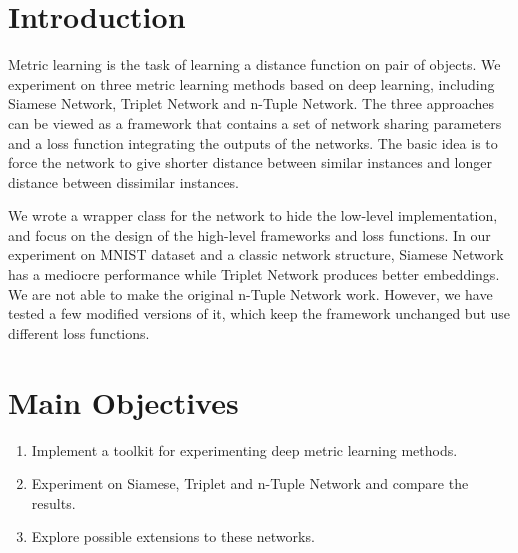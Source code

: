 \documentclass[a0,portrait]{a0poster}
\begin{document}
	\begin{multicols}{2} %
		
		
		\color{SaddleBrown} %
		
		\section*{Introduction}
		Metric learning is the task of learning a distance function on pair of objects. We experiment on three metric learning methods based on deep learning, including Siamese Network, Triplet Network and n-Tuple Network. The three approaches can be viewed as a framework that contains a set of network sharing parameters and a loss function integrating the outputs of the networks. The basic idea is to force the network to give shorter distance between similar instances and longer distance between dissimilar instances.
		
		We wrote a wrapper class for the network to hide the low-level implementation, and focus on the design of the high-level frameworks and loss functions. In our experiment on MNIST dataset and a classic network structure, Siamese Network has a mediocre performance while Triplet Network produces better embeddings. We are not able to make the original n-Tuple Network work. However, we have tested a few modified versions of it, which keep the framework unchanged but use different loss functions.
		
		
		\color{DarkSlateGray} %
		
		\section*{Main Objectives}
		
		\begin{enumerate}
			\item Implement a toolkit for experimenting deep metric learning methods.
			\item Experiment on Siamese, Triplet and n-Tuple Network and compare the results.
			\item Explore possible extensions to these networks.
		\end{enumerate}
		

\end{multicols}
\end{document}
